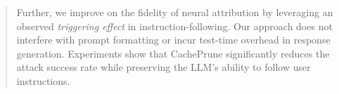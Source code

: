 \documentclass[11pt]{article}
\begin{document}
\begin{abstract}
Further, we improve on the fidelity of neural attribution by leveraging an observed \textit{triggering effect} in instruction-following. 
Our approach does not interfere with prompt formatting or incur test-time overhead in response generation.
Experiments show that CachePrune significantly reduces the attack success rate while preserving the LLM’s ability to follow user instructions.
\end{abstract}








\end{document}
